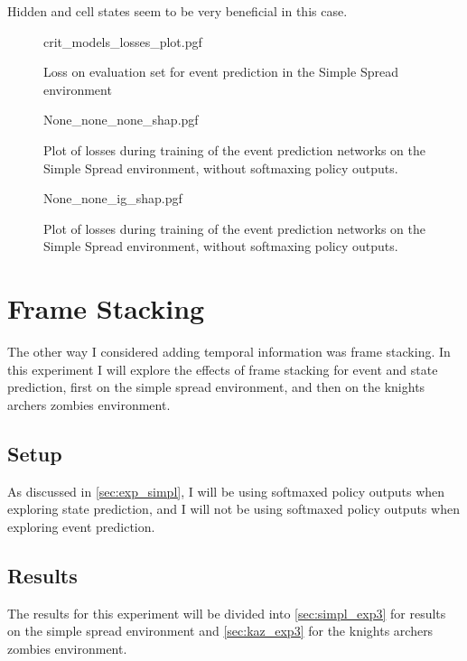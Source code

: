 \documentclass[UKenglish]{uiomasterthesis}
\begin{document}
Hidden and cell states seem to be very beneficial in this case.

\begin{figure}[hbtp]
    \centering
    {crit_models_losses_plot.pgf}
    \caption{Loss on evaluation set for event prediction in the Simple Spread environment}
	\label{fig:crit_losses_lstm}
\end{figure}


\begin{figure}[hbtp]
    \centering
    {None_none_none_shap.pgf}
    \caption{Plot of losses during training of the event prediction networks on the Simple Spread environment, without softmaxing policy outputs.}
    \label{fig:lstm_simpl_shap_crit}
\end{figure}


\begin{figure}[hbtp]
    \centering
    {None_none_ig_shap.pgf}
    \caption{Plot of losses during training of the event prediction networks on the Simple Spread environment, without softmaxing policy outputs.}
    \label{fig:lstm_simpl_ig_shap_crit}
\end{figure}

\section{Frame Stacking}
\label{sec:exp_stack}
The other way I considered adding temporal information was frame stacking. In this experiment I will explore the effects of frame stacking for event and state prediction, first on the simple spread environment, and then on the knights archers zombies environment. 

\subsection{Setup}
As discussed in \cref{sec:exp_simpl}, I will be using softmaxed policy outputs when exploring state prediction, and I will not be using softmaxed policy outputs when exploring event prediction.

\subsection{Results}
The results for this experiment will be divided into \cref{sec:simpl_exp3} for results on the simple spread environment and \cref{sec:kaz_exp3} for the knights archers zombies environment.
\end{document}

